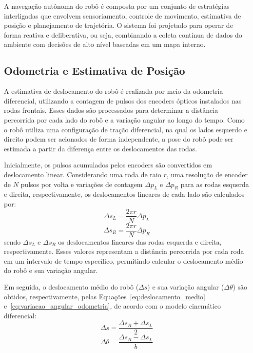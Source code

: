 \documentclass[	12pt, Times, openright, twoside, a4paper, english, brazil]{abntex2}
\begin{document}
A navegação autônoma do robô é composta por um conjunto de estratégias interligadas que envolvem sensoriamento, controle de movimento, estimativa de posição e planejamento de trajetória. O sistema foi projetado para operar de forma reativa e deliberativa, ou seja, combinando a coleta contínua de dados do ambiente com decisões de alto nível baseadas em um mapa interno.

\subsection{Odometria e Estimativa de Posição}

A estimativa de deslocamento do robô é realizada por meio da odometria diferencial, utilizando a contagem de pulsos dos encoders ópticos instalados nas rodas frontais. Esses dados são processados para determinar a distância percorrida por cada lado do robô e a variação angular ao longo do tempo. Como o robô utiliza uma configuração de tração diferencial, na qual os lados esquerdo e direito podem ser acionados de forma independente, a pose do robô pode ser estimada a partir da diferença entre os deslocamentos das rodas.

Inicialmente, os pulsos acumulados pelos encoders são convertidos em deslocamento linear. Considerando uma roda de raio $r$, uma resolução de encoder de $N$ pulsos por volta e variações de contagem $\Delta p_L$ e $\Delta p_R$ para as rodas esquerda e direita, respectivamente, os deslocamentos lineares de cada lado são calculados por:
\begin{equation}
	\Delta s_L = \frac{2\pi r}{N}\Delta p_L
	\label{eq:deslocamento_roda_esquerda}
\end{equation}
\begin{equation}
	\Delta s_R = \frac{2\pi r}{N}\Delta p_R
	\label{eq:deslocamento_roda_direita}
\end{equation}
\noindent sendo $\Delta s_L$ e $\Delta s_R$ os deslocamentos lineares das rodas esquerda e direita, respectivamente. Esses valores representam a distância percorrida por cada roda em um intervalo de tempo específico, permitindo calcular o deslocamento médio do robô e sua variação angular.

Em seguida, o deslocamento médio do robô ($\Delta s$) e sua variação angular ($\Delta \theta$) são obtidos, respectivamente, pelas Equações~\ref{eq:deslocamento_medio} e~\ref{eq:variacao_angular_odometria}, de acordo com o modelo cinemático diferencial:
\begin{equation}
	\Delta s = \frac{\Delta s_R + \Delta s_L}{2}
	\label{eq:deslocamento_medio}
\end{equation}
\begin{equation}
	\Delta \theta = \frac{\Delta s_R - \Delta s_L}{b}
	\label{eq:variacao_angular_odometria}
\end{equation}
\end{document}
